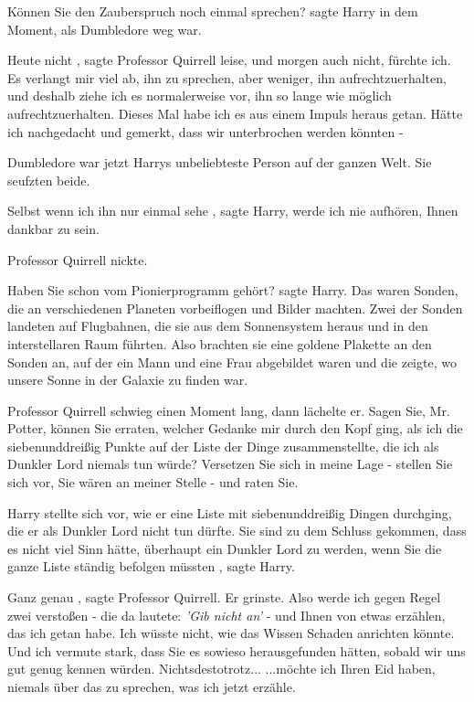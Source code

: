 \glqq Können Sie den Zauberspruch noch einmal sprechen?\grqq{} sagte Harry in
dem Moment, als Dumbledore weg war.

\glqq Heute nicht\grqq{} , sagte Professor Quirrell leise, \glqq und morgen auch
nicht, fürchte ich. Es verlangt mir viel ab, ihn zu sprechen, aber weniger, ihn
aufrechtzuerhalten, und deshalb ziehe ich es normalerweise vor, ihn so lange wie
möglich aufrechtzuerhalten. Dieses Mal habe ich es aus einem Impuls heraus
getan. Hätte ich nachgedacht und gemerkt, dass wir unterbrochen werden könnten
-\grqq{}

Dumbledore war jetzt Harrys unbeliebteste Person auf der ganzen Welt. Sie
seufzten beide.

\glqq Selbst wenn ich ihn nur einmal sehe\grqq{} , sagte Harry, \glqq werde ich
nie aufhören, Ihnen dankbar zu sein.\grqq{}

Professor Quirrell nickte.

\glqq Haben Sie schon vom Pionierprogramm gehört?\grqq{} sagte Harry. \glqq Das
waren Sonden, die an verschiedenen Planeten vorbeiflogen und Bilder machten.
Zwei der Sonden landeten auf Flugbahnen, die sie aus dem Sonnensystem heraus und
in den interstellaren Raum führten. Also brachten sie eine goldene Plakette an
den Sonden an, auf der ein Mann und eine Frau abgebildet waren und die zeigte,
wo unsere Sonne in der Galaxie zu finden war.\grqq{}

Professor Quirrell schwieg einen Moment lang, dann lächelte er. \glqq Sagen Sie,
Mr. Potter, können Sie erraten, welcher Gedanke mir durch den Kopf ging, als ich
die siebenunddreißig Punkte auf der Liste der Dinge zusammenstellte, die ich als
Dunkler Lord niemals tun würde? Versetzen Sie sich in meine Lage - stellen Sie
sich vor, Sie wären an meiner Stelle - und raten Sie.\grqq{}

Harry stellte sich vor, wie er eine Liste mit siebenunddreißig Dingen durchging,
die er als Dunkler Lord nicht tun dürfte. \glqq Sie sind zu dem Schluss
gekommen, dass es nicht viel Sinn hätte, überhaupt ein Dunkler Lord zu werden,
wenn Sie die ganze Liste ständig befolgen müssten\grqq{} , sagte Harry.

\glqq Ganz genau\grqq{} , sagte Professor Quirrell. Er grinste. \glqq Also werde
ich gegen Regel zwei verstoßen - die da lautete: \emph{'Gib nicht an'} - und
Ihnen von etwas erzählen, das ich getan habe. Ich wüsste nicht, wie das Wissen
Schaden anrichten könnte. Und ich vermute stark, dass Sie es sowieso
herausgefunden hätten, sobald wir uns gut genug kennen würden.
Nichtsdestotrotz... ...möchte ich Ihren Eid haben, niemals über das zu sprechen,
was ich jetzt erzähle.\grqq{}

